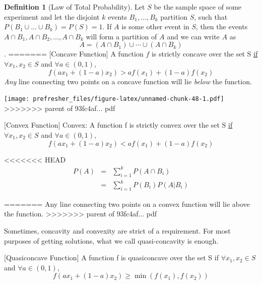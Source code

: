 \documentclass[]{book}
\theoremstyle{definition}
\newtheorem{definition}{Definition}[chapter]
\theoremstyle{definition}
\theoremstyle{definition}
\theoremstyle{remark}
\begin{document}
\begin{definition}[Law of Total Probability]
\protect\hypertarget{def:unnamed-chunk-69}{}{\label{def:unnamed-chunk-69} {} }Let \(S\) be the sample space of some experiment and let the disjoint \(k\) events \(B_1,\ldots,B_k\) partition \(S\), such that \(P(B_1\cup ... \cup B_k) = P(S) = 1\). If \(A\) is some other event in \(S\), then the events \(A\cap B_1, A\cap B_2, \ldots, A\cap B_k\) will form a partition of \(A\) and we can write \(A\) as \[A=(A\cap B_1)\cup\cdots\cup (A\cap B_k)\].
=======
[Concave Function]
\protect\hypertarget{def:unnamed-chunk-47}{}{\label{def:unnamed-chunk-47} {} }A function \(f\) is strictly concave over the set S \underline{if} \(\forall x_1,x_2 \in S\) and \(\forall a \in (0,1)\), \[f(ax_1 + (1-a)x_2) > af(x_1) + (1-a)f(x_2)\]
\textit{Any} line connecting two points on a concave function will lie \textit{below} the function.

\texttt{[image: prefresher\_files/figure-latex/unnamed-chunk-48-1.pdf]}
>>>>>>> parent of 93fc4af... pdf

[Convex Function]
\protect\hypertarget{def:unnamed-chunk-49}{}{\label{def:unnamed-chunk-49} {} }Convex: A function f is strictly convex over the set S \underline{if} \(\forall x_1,x_2 \in S\) and \(\forall a \in (0,1)\), \[f(ax_1 + (1-a)x_2) < af(x_1) + (1-a)f(x_2)\]

<<<<<<< HEAD
\begin{eqnarray*}
P(A)&=&\sum\limits_{i=1}^k P(A \cap B_i)\\
      &=&\sum\limits_{i=1}^k P(B_i)P(A|B_i)
\end{eqnarray*}
\end{definition}
=======
Any line connecting two points on a convex function will lie above the function.
>>>>>>> parent of 93fc4af... pdf

Sometimes, concavity and convexity are strict of a requirement. For most purposes of getting solutions, what we call quasi-concavity is enough.

[Quasiconcave Function]
\protect\hypertarget{def:unnamed-chunk-50}{}{\label{def:unnamed-chunk-50} {} }A function f is quasiconcave over the set S if \(\forall x_1,x_2 \in S\) and \(\forall a \in (0,1)\), \[f(ax_1 + (1-a)x_2) \ge \min(f(x_1),f(x_2))\]
\end{document}
